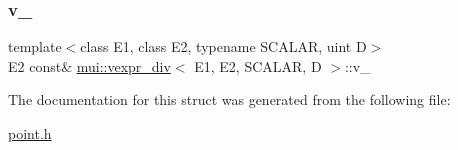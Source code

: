 \subsubsection{\texorpdfstring{v\+\_\+}{v\_}}
{\footnotesize\ttfamily template$<$class E1, class E2, typename S\+C\+A\+L\+AR, uint D$>$ \\
E2 const\& \hyperlink{structmui_1_1vexpr__div}{mui\+::vexpr\+\_\+div}$<$ E1, E2, S\+C\+A\+L\+AR, D $>$\+::v\+\_\+\hspace{0.3cm}{\ttfamily [protected]}}



The documentation for this struct was generated from the following file\+:\begin{DoxyCompactItemize}
\item 
\hyperlink{point_8h}{point.\+h}\end{DoxyCompactItemize}
